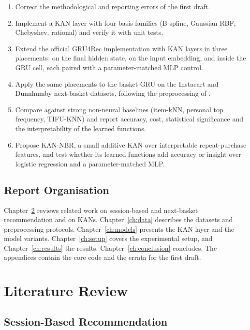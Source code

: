 \documentclass[12pt,a4paper]{report}
\begin{document}
\begin{enumerate}
    \item Correct the methodological and reporting errors of the first draft.
    \item Implement a KAN layer with four basis families (B-spline, Gaussian RBF,
          Chebyshev, rational) and verify it with unit tests.
    \item Extend the official GRU4Rec implementation with KAN layers in three
          placements: on the final hidden state, on the input embedding, and
          inside the GRU cell, each paired with a parameter-matched MLP control.
    \item Apply the same placements to the basket-GRU on the Instacart and
          Dunnhumby next-basket datasets, following the preprocessing of
          \cite{vanmaasakkers2023}.
    \item Compare against strong non-neural baselines (item-kNN, personal top
          frequency, TIFU-KNN) and report accuracy, cost, statistical
          significance and the interpretability of the learned functions.
    \item Propose KAN-NBR, a small additive KAN over interpretable repeat-purchase
          features, and test whether its learned functions add accuracy or
          insight over logistic regression and a parameter-matched MLP.
\end{enumerate}

\section{Report Organisation}

Chapter~\ref{ch:literature} reviews related work on session-based and
next-basket recommendation and on KANs. Chapter~\ref{ch:data} describes the
datasets and preprocessing protocols. Chapter~\ref{ch:models} presents the KAN
layer and the model variants. Chapter~\ref{ch:setup} covers the experimental
setup, and Chapter~\ref{ch:results} the results. Chapter~\ref{ch:conclusion}
concludes. The appendices contain the core code and the errata for the first
draft.

\chapter{Literature Review}
\label{ch:literature}

\section{Session-Based Recommendation}
\end{document}
